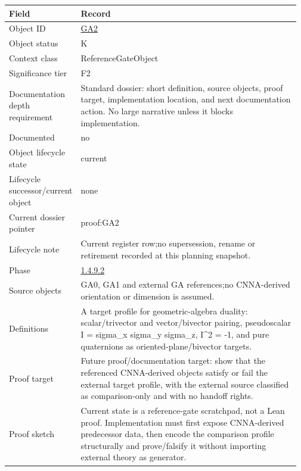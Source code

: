 \begin{longtable}{L{0.16\linewidth} L{0.81\linewidth}}
\hline
\textbf{Field} & \textbf{Record}\\
\hline
Object ID & \hyperlink{object-row-GA2}{GA2}\\
\hline\addlinespace[0.20em]
Object status & K\\
\hline\addlinespace[0.20em]
Context class & ReferenceGateObject\\
\hline\addlinespace[0.20em]
Significance tier & F2\\
\hline\addlinespace[0.20em]
Documentation depth requirement & Standard dossier: short definition, source objects, proof target, implementation location, and next documentation action. No large narrative unless it blocks implementation.\\
\hline\addlinespace[0.20em]
Documented & no\\
\hline\addlinespace[0.20em]
Object lifecycle state & current\\
\hline\addlinespace[0.20em]
Lifecycle successor/\allowbreak{}current object & none\\
\hline\addlinespace[0.20em]
Current dossier pointer & proof:GA2\\
\hline\addlinespace[0.20em]
Lifecycle note & Current register row;\newline no supersession, rename or retirement recorded at this planning snapshot.\\
\hline\addlinespace[0.20em]
Phase & \hyperlink{phase-row-1-4-9-2}{1.4.9.2}\\
\hline\addlinespace[0.20em]
Source objects & GA0, GA1 and external GA references;\newline no CNNA-derived orientation or dimension is assumed.\\
\hline\addlinespace[0.20em]
Definitions & A target profile for geometric-algebra duality: scalar/\allowbreak{}trivector and vector/\allowbreak{}bivector pairing, pseudoscalar I = sigma\_x sigma\_y sigma\_z, I\textasciicircum{}2 = -1, and pure quaternions as oriented-plane/\allowbreak{}bivector targets.\\
\hline\addlinespace[0.20em]
Proof target & Future proof/\allowbreak{}documentation target: show that the referenced CNNA-derived objects satisfy or fail the external target profile, with the external source classified as comparison-only and with no handoff rights.\\
\hline\addlinespace[0.20em]
Proof sketch & Current state is a reference-gate scratchpad, not a Lean proof. Implementation must first expose CNNA-derived predecessor data, then encode the comparison profile structurally and prove/\allowbreak{}falsify it without importing external theory as generator.\\

\end{longtable}
